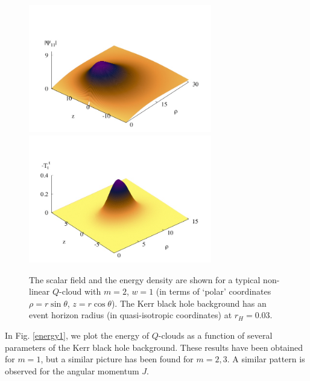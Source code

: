 \begin{figure}[h!]
\centering
\includegraphics[height=2.2in]{papers/QClouds/Z-3d.jpeg}
\includegraphics[height=2.2in]{papers/QClouds/E-3d.jpeg}
\caption{The scalar field and the energy density are shown for a typical
 non-linear $Q$-cloud with $m=2$, $w =1$ (in terms of `polar' coordinates $\rho=r\sin \theta$,
 $z=r \cos \theta$).
The Kerr black hole background has an event horizon radius (in quasi-isotropic coordinates) at
 $r_H=0.03$. 
} 
\label{densities}
\end{figure}

In Fig. \ref{energy1}, we plot the energy 
of $Q$-clouds as a function of several parameters of the Kerr black hole background. These results have been obtained for $m=1$, but a similar picture has been found for $m=2,3$. A similar pattern is observed for the angular momentum $J$.

